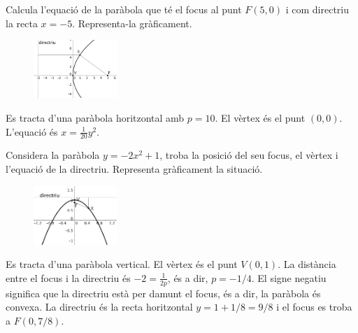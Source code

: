 \begin{resolt}[E]{ Calcula l'equació de la paràbola que té el focus al punt $F(5,0)$ i com directriu la recta $x=-5$. Representa-la gràficament.
	}
	\begin{figure} 
		\vspace{-0.5cm}
		\begin{center}
			\includegraphics[width=0.28\textwidth]{img-10/exem-p1.png}
		\end{center}
	\end{figure}
	
	
	
	Es tracta d'una paràbola horitzontal amb $p=10$. El vèrtex és el punt $(0,0)$.  L'equació és $x=\frac{1}{20}y^2$.
	
	\vspace*{1.5cm}
	
\end{resolt}
\begin{resolt}{Considera la paràbola  $y=-2 x^2 + 1$, troba la posició del seu focus, el vèrtex i l'equació de la directriu. Representa gràficament la situació.}
	 \begin{figure} 
		\vspace{-0.5cm}
		\begin{center}
			\includegraphics[width=0.28\textwidth]{img-10/exem-p2.png}
		\end{center}
	\end{figure}
 
	
	Es tracta d'una paràbola vertical. El vèrtex és el punt $V(0, 1)$. La distància entre el focus i la directriu és $-2=\frac{1}{2p}$, és a dir, $p=-1/4$. El signe negatiu significa que la directriu està per damunt el focus, és a dir, la paràbola és convexa. La directriu és la recta horitzontal $y= 1+1/8=9/8$ i el focus es troba a $F(0,7/8)$. 
	 
	
\end{resolt}
\vspace{0.5cm}
 
